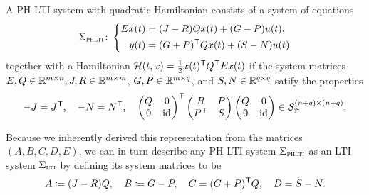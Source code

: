 \begin{definition}\label{def:phlti}
    A \acl{PH} \ac{LTI} system with quadratic Hamiltonian consists of a system of equations
    \begin{equation}\label{eq:phlti}
        \Sigma_{\textnormal{\scshape phlti}} \colon \left\lbrace
        \begin{aligned}
            E \dot{x}(t) &= (J - R) Q x(t) + (G - P) u(t), \\
            y(t) &= (G + P)^{\mkern1mu \mathsf{T}} Q x(t) + (S - N) u(t)
        \end{aligned}
        \right.
    \end{equation}
    together with a Hamiltonian $\mathcal{H}(t, x) = \frac{1}{2} x(t)^{\mkern1mu \mathsf{T}} Q^{\mkern1mu \mathsf{T}} E x(t)$ if the system matrices $E, Q \in \mathbb{R}^{m \times n}, J, R \in \mathbb{R}^{m \times m}$, $G, P \in \mathbb{R}^{m \times q}$, and $S, N \in \mathbb{R}^{q \times q}$ satify the properties
    \begin{equation}\label{eq:ph-matrix-structure}
        -J = J^{\mkern1mu \mathsf{T}},\quad -N = N^{\mkern1mu \mathsf{T}},\quad
        \begin{pmatrix}
            Q & 0 \\
            0 & \text{id}_{}
        \end{pmatrix}^{\mkern1mu \mathsf{T}}
        \begin{pmatrix}
            R & P \\
            P^{\mkern1mu \mathsf{T}} & S
        \end{pmatrix}
        \begin{pmatrix}
            Q & 0 \\
            0 & \text{id}_{}
        \end{pmatrix}
        \in \mathcal{S}_{\curlyeqsucc}^{(n + q) \times (n + q)}.
    \end{equation}
\end{definition}

\begin{remark}
    Because we inherently derived this representation from the matrices $(A, B, C, D, E)$, we can in turn describe any \ac{PH} \ac{LTI} system $\Sigma_{\textnormal{\scshape phlti}}$ as an \ac{LTI} system $\Sigma_{\textnormal{\scshape lti}}$ by defining its system matrices to be
    \begin{equation*}
        A \coloneqq (J - R) Q,\quad B \coloneqq G - P,\quad C = (G + P)^{\mkern1mu \mathsf{T}} Q,\quad D = S - N.
    \end{equation*}
\end{remark}

